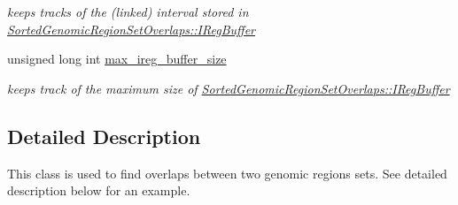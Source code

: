 \begin{DoxyCompactItemize}
\begin{DoxyCompactList}\small\item\em keeps tracks of the (linked) interval stored in \hyperlink{classSortedGenomicRegionSetOverlaps_a19fa18e6abd9f045786698fff48a445f}{SortedGenomicRegionSetOverlaps::IRegBuffer} \end{DoxyCompactList}\item 
\hypertarget{classSortedGenomicRegionSetOverlaps_a349d589ff006f742d635b16987fe7b6b}{
unsigned long int \hyperlink{classSortedGenomicRegionSetOverlaps_a349d589ff006f742d635b16987fe7b6b}{max\_\-ireg\_\-buffer\_\-size}}
\label{classSortedGenomicRegionSetOverlaps_a349d589ff006f742d635b16987fe7b6b}

\begin{DoxyCompactList}\small\item\em keeps track of the maximum size of \hyperlink{classSortedGenomicRegionSetOverlaps_a19fa18e6abd9f045786698fff48a445f}{SortedGenomicRegionSetOverlaps::IRegBuffer} \end{DoxyCompactList}\end{DoxyCompactItemize}


\subsection{Detailed Description}
This class is used to find overlaps between two genomic regions sets. See detailed description below for an example. 

